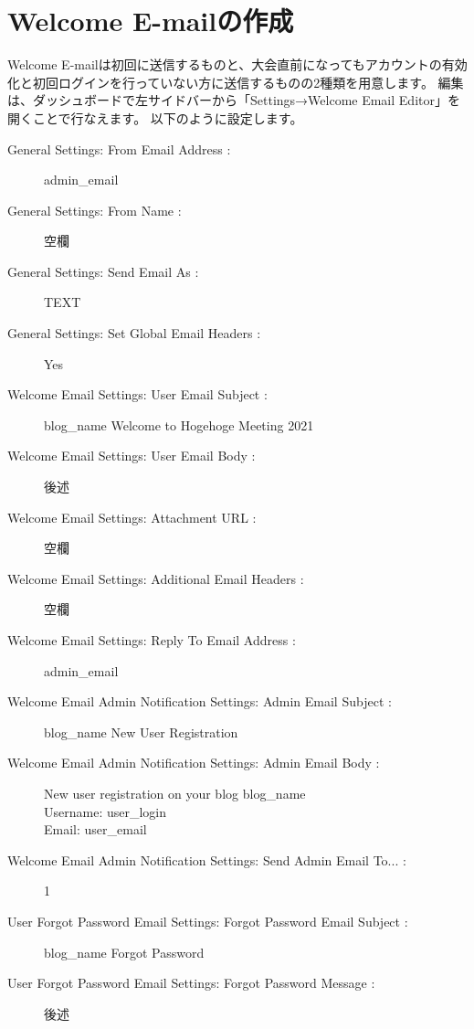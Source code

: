 \documentclass[titlepage,10pt,a4paper,uplatex]{jsbook}
\begin{document}
\section{Welcome E-mailの作成}

Welcome E-mailは初回に送信するものと、大会直前になってもアカウントの有効化と初回ログインを行っていない方に送信するものの2種類を用意します。
編集は、ダッシュボードで左サイドバーから「Settings→Welcome Email Editor」を開くことで行なえます。
以下のように設定します。

\begin{description}
\item[General Settings: From Email Address : ] {\lbrack}admin\_email{\rbrack}
\item[General Settings: From Name : ] 空欄
\item[General Settings: Send Email As : ] TEXT
\item[General Settings: Set Global Email Headers : ] Yes
\item[Welcome Email Settings: User Email Subject : ] {\lbrack}{\lbrack}blog\_name{\rbrack}{\rbrack} Welcome to Hogehoge Meeting 2021
\item[Welcome Email Settings: User Email Body : ] 後述
\item[Welcome Email Settings: Attachment URL : ] 空欄
\item[Welcome Email Settings: Additional Email Headers : ] 空欄
\item[Welcome Email Settings: Reply To Email Address : ] {\lbrack}admin\_email{\rbrack}
\item[Welcome Email Admin Notification Settings: Admin Email Subject : ] {\lbrack}{\lbrack}blog\_name{\rbrack}{\rbrack} New User Registration
\item[Welcome Email Admin Notification Settings: Admin Email Body : ] New user registration on your blog {\lbrack}blog\_name{\rbrack}\\
Username: {\lbrack}user\_login{\rbrack}\\
Email: {\lbrack}user\_email{\rbrack}
\item[Welcome Email Admin Notification Settings: Send Admin Email To... : ] 1
\item[User Forgot Password Email Settings: Forgot Password Email Subject : ] {\lbrack}{\lbrack}blog\_name{\rbrack}{\rbrack} Forgot Password
\item[User Forgot Password Email Settings: Forgot Password Message : ] 後述
\end{description}
\end{document}
